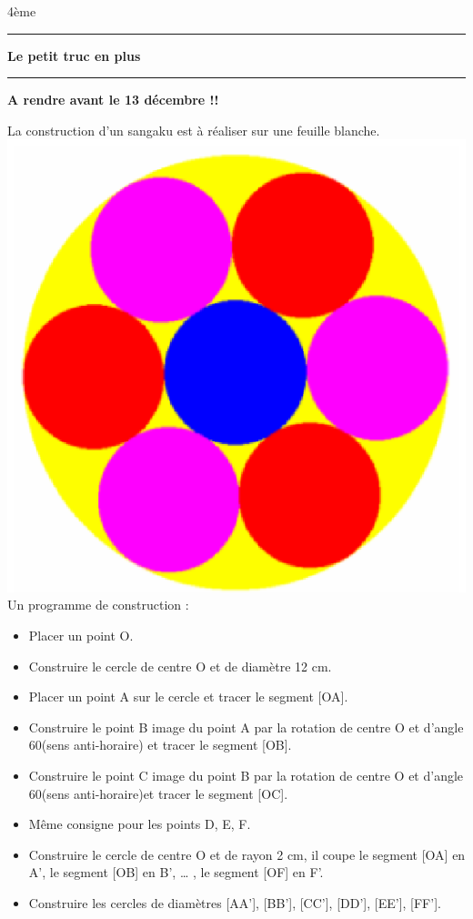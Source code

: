\documentclass[a4paper,11pt]{article}
\newcommand{\bi}{\begin{itemize}}
\newcommand{\ei}{\end{itemize}}
\newcommand{\titre}[5] 
{
\noindent #2 \hfill #4 \\
#3 \hfill #5

\vspace{-1.6cm}

\begin{center}\rule{6cm}{0.5mm}\end{center}
\vspace{0.2cm}
\begin{center}{\large{\textbf{#1}}}\end{center}
\begin{center}\rule{6cm}{0.5mm}\end{center}
}
\begin{document}
\pagestyle{empty}
\titre{Le petit truc en plus}{}{}{4ème}{}

\vspace*{1cm}

{\Large \textbf{A rendre avant le 13 décembre !!}}

\vspace*{1cm}
La construction d'un sangaku est à réaliser sur une feuille blanche.\\

\includegraphics[scale=1]{sangaku.eps} \\

Un programme de construction :\\
 
\bi \item Placer un point O.\\
\item Construire le cercle de centre O et de diamètre 12 cm.\\
\item Placer un point A sur le cercle et tracer le segment [OA].\\
\item Construire le point B image du point A par la rotation de centre O et d'angle 60\degre (sens anti-horaire) et tracer le segment [OB].\\
\item Construire le point C image du point B par la rotation de centre O et d’angle 60\degre (sens anti-horaire)et tracer le segment [OC].\\
\item Même consigne pour les points D, E, F.\\
\item Construire le cercle de centre O et de rayon 2 cm, il coupe le segment [OA] en A’, le segment [OB] en B’, … , le segment [OF] en F’.\\
\item Construire les cercles de diamètres [AA’], [BB’], [CC’], [DD’], [EE’], [FF’].\\
\ei
\end{document}
